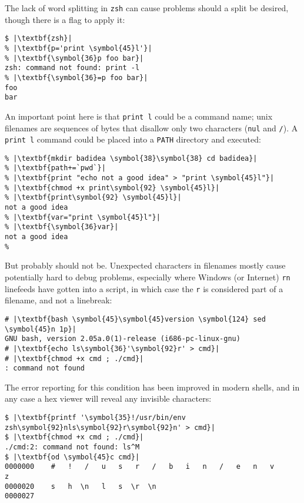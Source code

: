 \documentclass[10pt,a4paper]{article}
\begin{document}
The lack of word splitting in \texttt{zsh} can cause problems should a
split be desired, though there is a flag to apply it:

\begin{lstlisting}
$ |\textbf{zsh}|
% |\textbf{p='print \symbol{45}l'}|
% |\textbf{\symbol{36}p foo bar}|
zsh: command not found: print -l
% |\textbf{\symbol{36}=p foo bar}|
foo
bar
\end{lstlisting}

An important point here is that \texttt{print l} could be a
command name; unix filenames are sequences of bytes that disallow only
two characters (\texttt{nul} and \texttt{/}). A \texttt{print
l} command could be placed into a \texttt{PATH} directory
and executed:

\begin{lstlisting}
% |\textbf{mkdir badidea \symbol{38}\symbol{38} cd badidea}|
% |\textbf{path+=`pwd`}|
% |\textbf{print "echo not a good idea" > "print \symbol{45}l"}|
% |\textbf{chmod +x print\symbol{92} \symbol{45}l}|
% |\textbf{print\symbol{92} \symbol{45}l}|
not a good idea
% |\textbf{var="print \symbol{45}l"}|
% |\textbf{\symbol{36}var}|
not a good idea
%
\end{lstlisting}

But probably should not be. Unexpected characters in filenames mostly
cause potentially hard to debug problems, especially where Windows (or
Internet) \texttt{rn} linefeeds have gotten into a
script, in which case the \texttt{r} is considered part of a
filename, and not a linebreak:

\begin{lstlisting}
# |\textbf{bash \symbol{45}\symbol{45}version \symbol{124} sed \symbol{45}n 1p}|
GNU bash, version 2.05a.0(1)-release (i686-pc-linux-gnu)
# |\textbf{echo ls\symbol{36}'\symbol{92}r' > cmd}|
# |\textbf{chmod +x cmd ; ./cmd}|
: command not found
\end{lstlisting}

The error reporting for this condition has been improved in modern
shells, and in any case a hex viewer will reveal any invisible
characters:

\begin{lstlisting}
$ |\textbf{printf '\symbol{35}!/usr/bin/env zsh\symbol{92}nls\symbol{92}r\symbol{92}n' > cmd}|
$ |\textbf{chmod +x cmd ; ./cmd}|
./cmd:2: command not found: ls^M
$ |\textbf{od \symbol{45}c cmd}|
0000000    #   !   /   u   s   r   /   b   i   n   /   e   n   v       z
0000020    s   h  \n   l   s  \r  \n
0000027
\end{lstlisting}
\end{document}
